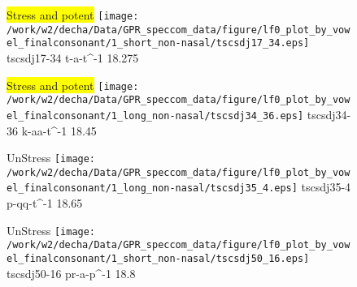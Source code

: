 \documentclass{article}
\begin{document}
\begin{figure}[t]
\begin{minipage}[b]{.24\textwidth}
\colorbox{yellow}{Stress and potent}
\centering
\texttt{[image: /work/w2/decha/Data/GPR\_speccom\_data/figure/lf0\_plot\_by\_vowel\_finalconsonant/1\_short\_non-nasal/tscsdj17\_34.eps]}
tscsdj17-34 t-a-t\textasciicircum-1 18.275
\end{minipage}
\begin{minipage}[b]{.24\textwidth}
\colorbox{yellow}{Stress and potent}
\centering
\texttt{[image: /work/w2/decha/Data/GPR\_speccom\_data/figure/lf0\_plot\_by\_vowel\_finalconsonant/1\_long\_non-nasal/tscsdj34\_36.eps]}
tscsdj34-36 k-aa-t\textasciicircum-1 18.45
\end{minipage}
\begin{minipage}[b]{.24\textwidth}
UnStress
\centering
\texttt{[image: /work/w2/decha/Data/GPR\_speccom\_data/figure/lf0\_plot\_by\_vowel\_finalconsonant/1\_long\_non-nasal/tscsdj35\_4.eps]}
tscsdj35-4 p-qq-t\textasciicircum-1 18.65
\end{minipage}
\begin{minipage}[b]{.24\textwidth}
UnStress
\centering
\texttt{[image: /work/w2/decha/Data/GPR\_speccom\_data/figure/lf0\_plot\_by\_vowel\_finalconsonant/1\_short\_non-nasal/tscsdj50\_16.eps]}
tscsdj50-16 pr-a-p\textasciicircum-1 18.8
\end{minipage}
\end{figure}
\end{document}
